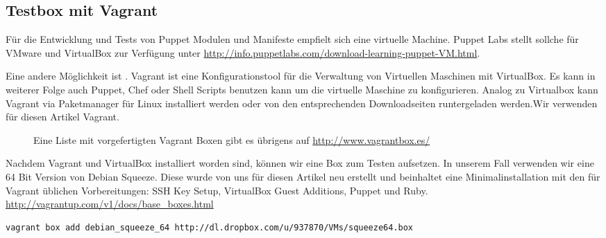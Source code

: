 \documentclass[12pt,a4paper,ngerman]{article}
\begin{document}



\subsection{Testbox mit Vagrant}
Für die Entwicklung und Tests von Puppet Modulen und Manifeste empfielt sich eine virtuelle Machine. Puppet Labs stellt sollche für VMware und VirtualBox zur Verfügung unter \url{http://info.puppetlabs.com/download-learning-puppet-VM.html}. 

Eine andere Möglichkeit ist \cite{vagrant}. Vagrant ist eine Konfigurationstool für die Verwaltung von Virtuellen Maschinen mit VirtualBox. Es kann in weiterer Folge auch Puppet, Chef oder Shell Scripts benutzen kann um die virtuelle Maschine zu konfigurieren. Analog zu Virtualbox kann Vagrant via Paketmanager für Linux installiert werden oder von den entsprechenden Downloadseiten runtergeladen werden.Wir verwenden für diesen Artikel Vagrant. 

\begin{figure}
\vspace{-15pt}
\begin{boxedminipage}{5cm}
Eine Liste mit vorgefertigten Vagrant Boxen gibt es übrigens auf \url{http://www.vagrantbox.es/}
\end{boxedminipage}
\vspace{-15pt}
\end{figure}

Nachdem Vagrant und VirtualBox installiert worden sind, können wir eine Box zum Testen aufsetzen. In unserem Fall verwenden wir eine 64 Bit Version von Debian Squeeze. Diese wurde von uns für diesen Artikel neu erstellt und beinhaltet eine Minimalinstallation mit den für Vagrant üblichen Vorbereitungen: SSH Key Setup, VirtualBox Guest Additions, Puppet und Ruby. \url{http://vagrantup.com/v1/docs/base_boxes.html}

\begin{lstlisting}[language=sh,caption=Download der Vagrant Box, label=vagrant-add]
vagrant box add debian_squeeze_64 http://dl.dropbox.com/u/937870/VMs/squeeze64.box
\end{lstlisting}
\end{document}
